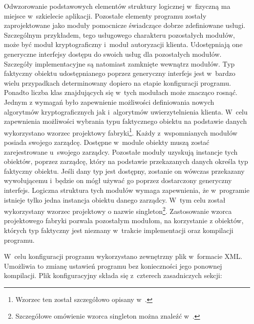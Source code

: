 
Odwzorowanie podstawowych elementów struktury logicznej w~fizyczną ma
miejsce w~szkielecie aplikacji. Pozostałe elementy programu zostały
zaprojektowane jako moduły pomocnicze świadczące dobrze zdefiniowane
usługi. Szczególnym przykładem, tego usługowego charakteru pozostałych
modułów, może być moduł kryptograficzny i~moduł autoryzacji
klienta. Udostępniają one generyczne interfejsy dostępu do swoich
usług dla pozostałych modułów. Szczegóły implementacyjne są natomiast
zamknięte wewnątrz modułów. Typ faktyczny obiektu udostępnianego
poprzez generyczny interfejs jest w~bardzo wielu przypadkach
determinowany dopiero na etapie konfiguracji programu. Ponadto liczba
klas znajdujących się w~tych modułach może znacząco rosnąć. Jednym z
wymagań było zapewnienie możliwości definiowania nowych algorytmów
kryptograficznych jak i~algorytmów uwierzytelnienia klienta. W~celu
zapewnienia możliwości wybrania typu faktycznego obiektu na podstawie
danych wykorzystano wzorzec projektowy fabryki\footnote{Wzorzec ten
  został szczegółowo opisany w~\cite[101-109]{book:wzorce}.}.  Każdy
z~wspomnianych modułów posiada swojego zarządcę. Dostępne w~module
obiekty muszą zostać zarejestrowane u~swojego zarządcy. Pozostałe
moduły uzyskują instancje tych obiektów, poprzez zarządcę, który na
podstawie przekazanych danych określa typ faktyczny obiektu. Jeśli
dany typ jest dostępny, zostanie on wówczas przekazany wywołującemu
i~będzie on mógł używać go poprzez dostarczony generyczny
interfejs. Logiczna struktura tych modułów wymaga zapewnienia, że
w~programie istnieje tylko jedna instancja obiektu danego
zarządcy. W~tym celu został wykorzystany wzorzec projektowy o nazwie
singleton\footnote{Szczegółowe omówienie wzorca singleton można
  znaleźć w~\cite[130-138]{book:wzorce}.}. Zastosowanie wzorca
projektowego fabryki pozwala pozostałym modułom, na korzystanie z
obiektów, których typ faktyczny jest nieznany w~trakcie implementacji
oraz kompilacji programu.

W~celu konfiguracji programu wykorzystano zewnętrzny plik w~formacie
XML. Umożliwia to zmianę ustawień programu bez konieczności jego
ponownej kompilacji. Plik konfiguracyjny składa się z~czterech
zasadniczych sekcji:

